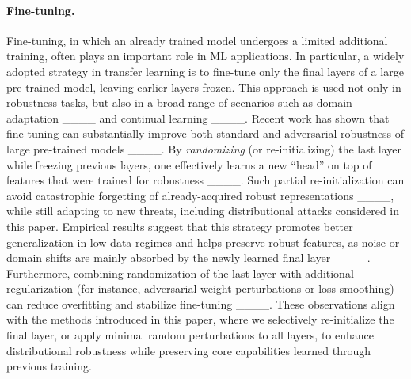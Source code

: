 \paragraph{Fine-tuning.} \label{subsec:finetuning-litreview}
Fine-tuning, in which an already trained model undergoes a limited additional training, often plays an important role in ML applications. 
In particular, a widely adopted strategy in transfer learning is to fine-tune only the final layers of a large pre-trained model, leaving earlier layers frozen. This approach is used not only in robustness tasks, but also in a broad range of scenarios such as domain adaptation ____ and continual learning ____.
Recent work has shown that fine-tuning can substantially improve both standard and adversarial robustness of large pre-trained models ____. 
By \emph{randomizing} (or re-initializing) the last layer while freezing previous layers, one effectively learns a new ``head'' on top of features that were trained for robustness ____. 
Such partial re-initialization can avoid catastrophic forgetting of already-acquired robust representations ____, while still adapting to new threats, including distributional attacks considered in this paper. 
Empirical results suggest that this strategy promotes better generalization in low-data regimes and helps preserve robust features, as noise or domain shifts are mainly absorbed by the newly learned final layer ____. Furthermore, combining randomization of the last layer with additional regularization (for instance, adversarial weight perturbations or loss smoothing) can reduce overfitting and stabilize fine-tuning ____. 
These observations align with the methods introduced in this paper, where we selectively re-initialize the final layer, or apply minimal random perturbations to all layers, to enhance distributional robustness while preserving core capabilities learned through previous training.